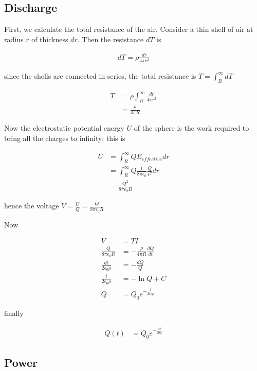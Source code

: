 \documentclass{article}
\begin{document}
\subsection{Discharge}

First, we calculate the total resistance of the air. Consider a thin shell of air at radius $r$ of thickness $dr$. Then the resistance $dT$ is

\begin{align*}
dT = \rho \frac{dr}{4\pi r^2}
\end{align*}

since the shells are connected in series, the total resistance is $T = \int_R^\infty dT$

\begin{align*}
T &= \rho \int_R^\infty \frac{dr}{4\pi r^2} \\
&= \frac{\rho}{4\pi R}
\end{align*}

Now the electrostatic potential energy $U$ of the sphere is the work required to bring all the charges to infinity; this is 

\begin{align*}
U &= \int_R^\infty Q E_{effective} dr \\
&= \int_R^\infty Q \frac{1}{8\pi\epsilon_0}\frac{Q}{r^2} dr \\
&= \frac{Q^2}{8\pi\epsilon_0R}
\end{align*}

hence the voltage $V = \frac{U}{Q} = \frac{Q}{8\pi\epsilon_0R}$

Now

\begin{align*}
V &= TI \\
\frac{Q}{8\pi\epsilon_0R} &= -\frac{\rho}{4\pi R} \frac{dQ}{dt} \\
\frac{dt}{2\epsilon_0\rho} &= -\frac{dQ}{Q} \\
\frac{t}{2\epsilon_0\rho} &= -\ln{Q} + C \\
Q &= Q_0 e^{-\frac{t}{2\epsilon_0\rho}}
\end{align*}

finally

\begin{align*}
Q(t) &= Q_0 e^{-\frac{st}{2\epsilon_0}}
\end{align*}

\subsection{Power}
\end{document}
